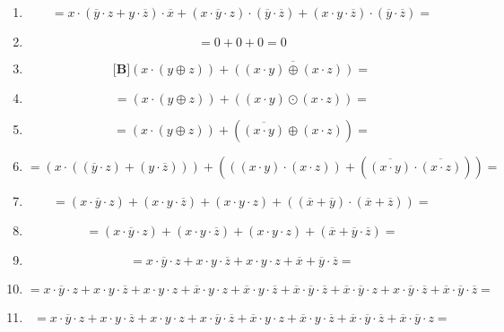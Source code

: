 \begin{enumerate}
\begin{enumerate}
\begin{enumerate}
\begin{enumerate}
\begin{enumerate}
        \item
          \[{= {{{{x \cdot {({{\overline{y} \cdot z} + {y \cdot \overline{z}}})}} \cdot \overline{x}} + {{({{x \cdot \overline{y}} \cdot z})} \cdot {({\overline{y} \cdot \overline{z}})}}} + {{({{x \cdot y} \cdot \overline{z}})} \cdot {({\overline{y} \cdot \overline{z}})}}}} =\]
        \item
          \[{= {{0 + 0} + 0}} = 0\]
        \item
          \[{\lbrack\mathbf{B}\rbrack}{{{({x \cdot {({y \oplus z})}})} + \overline{({{({x\cdot y})}\oplus{({x\cdot z})}})}} =}\]
        \item
          \[{= {{({x \cdot {({y \oplus z})}})} + {({{({x \cdot y})} \odot {({x \cdot z})}})}}} =\]
        \item
          \[{= {{({x \cdot {({y \oplus z})}})} + {({\overline{({x\cdot y})} \oplus {({x \cdot z})}})}}} =\]
        \item
          \[{= {{({x \cdot {({{({\overline{y} \cdot z})} + {({y \cdot \overline{z}})}})}})} + {({{({{({x \cdot y})} \cdot {({x \cdot z})}})} + {({\overline{({x\cdot y})} \cdot \overline{({x\cdot z})}})}})}}} =\]
        \item
          \[{= {{{{({{x \cdot \overline{y}} \cdot z})} + {({{x \cdot y} \cdot \overline{z}})}} + {({{x \cdot y} \cdot z})}} + {({{({\overline{x} + \overline{y}})} \cdot {({\overline{x} + \overline{z}})}})}}} =\]
        \item
          \[{= {{{{({{x \cdot \overline{y}} \cdot z})} + {({{x \cdot y} \cdot \overline{z}})}} + {({{x \cdot y} \cdot z})}} + {({\overline{x} + {\overline{y} \cdot \overline{z}}})}}} =\]
        \item
          \[{= {{{{{{x \cdot \overline{y}} \cdot z} + {{x \cdot y} \cdot \overline{z}}} + {{x \cdot y} \cdot z}} + \overline{x}} + {\overline{y} \cdot \overline{z}}}} =\]
        \item
          \[{= {{{{{{{{{{x \cdot \overline{y}} \cdot z} + {{x \cdot y} \cdot \overline{z}}} + {{x \cdot y} \cdot z}} + {{\overline{x} \cdot y} \cdot z}} + {{\overline{x} \cdot y} \cdot \overline{z}}} + {{\overline{x} \cdot \overline{y}} \cdot \overline{z}}} + {{\overline{x} \cdot \overline{y}} \cdot z}} + {{x \cdot \overline{y}} \cdot \overline{z}}} + {{\overline{x} \cdot \overline{y}} \cdot \overline{z}}}} =\]
        \item
          \[{= {{{{{{{{{x \cdot \overline{y}} \cdot z} + {{x \cdot y} \cdot \overline{z}}} + {{x \cdot y} \cdot z}} + {{x \cdot \overline{y}} \cdot \overline{z}}} + {{\overline{x} \cdot y} \cdot z}} + {{\overline{x} \cdot y} \cdot \overline{z}}} + {{\overline{x} \cdot \overline{y}} \cdot \overline{z}}} + {{\overline{x} \cdot \overline{y}} \cdot z}}} =\]

\end{enumerate}
\end{enumerate}
\end{enumerate}
\end{enumerate}
\end{enumerate}
